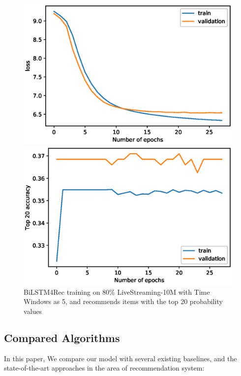 \documentclass[runningheads]{llncs}
\begin{document}
\begin{figure}[!htb]
   \begin{minipage}{0.48\textwidth}
     \centering
     \includegraphics[width=\linewidth]{image/model_loss.eps}
   \end{minipage}\hfill
   \begin {minipage}{0.48\textwidth}
     \centering
     \includegraphics[width=\linewidth]{image/Top_20_accuracy.eps}
   \end{minipage}
   \caption{BiLSTM4Rec training on 80\% LiveStreaming-10M with Time Windows as 5, and recommends items with the top 20 probability values}
\end{figure}


\subsection{Compared Algorithms}
In this paper, We compare our model with several existing baselines, and the state-of-the-art approaches in the area of recommendation system:
\end{document}
